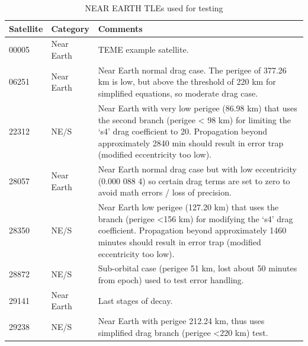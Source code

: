 \documentclass{article}
\begin{document}
\begin{table}[p]
\centering
\caption{NEAR EARTH TLEs used for testing}\vspace{2mm}
\begin{tabular}{|l|l|p{14cm}|}
\hline\hline
Satellite & Category & Comments\\
\hline
00005 & Near Earth & TEME example satellite.\\
06251 &  Near Earth  & Near Earth normal drag case. The perigee of 377.26 km is low, but above the threshold of 220
km for simplified equations, so moderate drag case.\\
22312  & NE/S  & Near Earth with very low perigee (86.98 km) that uses the second branch (perigee < 98 km)
for limiting the ‘s4’ drag coefficient to 20. Propagation beyond approximately 2840 min
should result in error trap (modified eccentricity too low).\\
28057 &  Near Earth  & Near Earth normal drag case but with low eccentricity (0.000 088 4) so certain drag terms are
set to zero to avoid math errors / loss of precision.\\
28350 & NE/S  & Near Earth low perigee (127.20 km) that uses the branch (perigee \textless 156 km) for modifying
the ‘s4’ drag coefficient. Propagation beyond approximately 1460 minutes should result in
error trap (modified eccentricity too low).\\
28872  & NE/S  & Sub-orbital case (perigee 51 km, lost about 50 minutes from epoch) used to test error handling.\\
29141  & Near Earth  & Last stages of decay.\\
29238  & NE/S  & Near Earth with perigee 212.24 km, thus uses simplified drag branch (perigee \textless 220 km) test.\\
\hline\hline
\end{tabular}
\label{tab:res}
\end{table}












\end{document}
